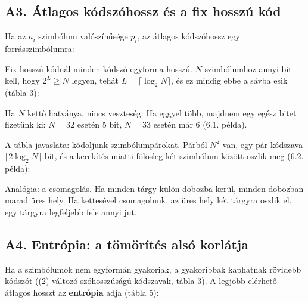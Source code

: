 \subsection{\texorpdfstring{A3. Átlagos kódszóhossz és a fix hosszú kód}{A3. Átlagos kódszóhossz és a fix hosszú kód}}\label{a6-hossz}
Ha az $a_i$ szimbólum valószínűsége $p_i$, az átlagos kódszóhossz egy forrásszimbólumra:

\begin{center}\end{center}

Fix hosszú kódnál minden kódszó egyforma hosszú. $N$ szimbólumhoz annyi bit kell, hogy $2^L \ge N$ legyen, tehát $L=\lceil \log_2 N\rceil$, és ez mindig ebbe a sávba esik (tábla 3):

\begin{center}\end{center}

Ha $N$ kettő hatványa, nincs veszteség. Ha eggyel több, majdnem egy egész bitet fizetünk ki: $N=32$ esetén 5 bit, $N=33$ esetén már 6 (6.1. példa).

A tábla javaslata: kódoljunk szimbólumpárokat. Párból $N^2$ van, egy pár kódszava $\lceil 2\log_2 N\rceil$ bit, és a kerekítés miatti fölösleg két szimbólum között oszlik meg (6.2. példa):

\begin{center}\end{center}

Analógia: a csomagolás. Ha minden tárgy külön dobozba kerül, minden dobozban marad üres hely. Ha kettesével csomagolunk, az üres hely két tárgyra oszlik el, egy tárgyra legfeljebb fele annyi jut.

\subsection{\texorpdfstring{A4. Entrópia: a tömörítés alsó korlátja}{A4. Entrópia: a tömörítés alsó korlátja}}\label{a6-entropia}
Ha a szimbólumok nem egyformán gyakoriak, a gyakoribbak kaphatnak rövidebb kódszót ((2) változó szóhosszúságú kódszavak, tábla 3). A legjobb elérhető átlagos hosszt az \textbf{entrópia} adja (tábla 5):

